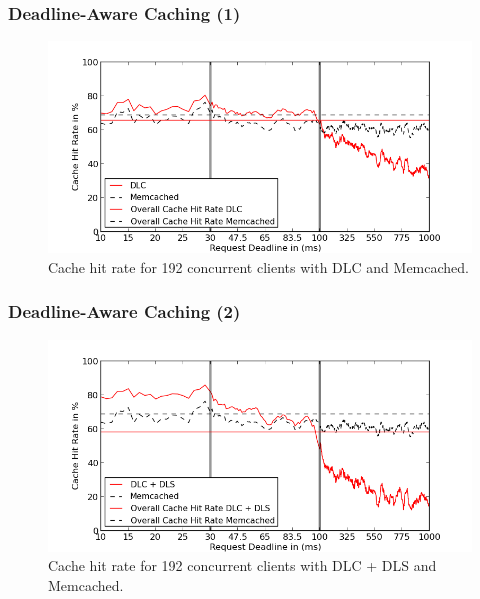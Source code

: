 \documentclass{beamer}
\begin{document}
\begin{frame}
  \frametitle{Deadline-Aware Caching (1)}
  \begin{figure}[t]
    \begin{center}
      \centerline{\includegraphics[scale=0.5]{img/EC2/EC2_CS_MM/cache_48.png}}
      \caption{Cache hit rate for 192 concurrent clients with DLC and Memcached.}
      \label{fig:cache_192_cs_mm}
    \end{center}
  \end{figure}
\end{frame}

\begin{frame}
  \frametitle{Deadline-Aware Caching (2)}
  \begin{figure}[t]
    \begin{center}
      \centerline{\includegraphics[scale=0.5]{img/EC2/EC2_SH_MM/cache_48.png}}
      \caption{Cache hit rate for 192 concurrent clients with DLC + DLS and Memcached.}
      \label{fig:cache_192_sh_mm}
    \end{center}
  \end{figure}
\end{frame}

\end{document}
